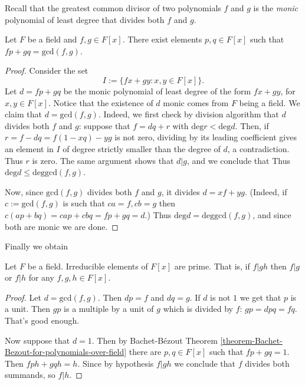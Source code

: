 Recall that the greatest common divisor of two polynomials $f$ and $g$ 
is the {\it monic}
polynomial of least degree that divides both $f$ and $g$.

\begin{theorem}
\label{theorem-Bachet-Bezout-for-polynomials-over-field}
\begin{reference}
\cite[Theorem 1.53]{MMST}
\end{reference}
Let $F$ be a field and $f,g\in F[x]$. 
There exist elements  $p,q \in F[x]$ such that $fp+gq=\text{gcd}(f,g)$.
\end{theorem}

\begin{proof}
Consider the set
$$
I:=\{fx+gy:x,y \in F[x]\}.
$$
Let $d=fp+gq$ be the monic polynomial of least degree 
of the form $fx+gy$, for $x,y \in F[x]$.
Notice that the existence of $d$ monic comes from $F$ being a field.
We claim that $d=\text{gcd}(f,g)$. 
Indeed, we first check by division algorithm
that $d$ divides both $f$ and $g$: 
suppose that $f=dq+r$ with $\text{deg}r<\text{deg}d$. 
Then, if $r=f-dq=f(1-xq)-yg$ is not zero, 
dividing by its leading coefficient gives an element in $I$ 
of degree strictly smaller than the degree of $d$, a contradiction.
Thus $r$ is zero. The same argument shows that $d|g$, and we conclude that
Thus $\text{deg}d \leq \text{deg}\text{gcd}(f,g)$. 

Now, since
$\text{gcd}(f,g)$ divides both $f$ and $g$, it divides $d=xf+yg$. (Indeed, if
$c:=\text{gcd}(f,g)$ is such that $ca=f,cb=g$ then $c(ap+bq)=cap+cbq=fp+gq=d$.) 
Thus $\text{deg}d=\text{deg}\text{gcd}(f,g)$, and since both are monic we are
done.
\end{proof}

Finally we obtain

\begin{lemma}
\label{lemma-irreducible-is-prime-in-F[x]}
Let $F$ be a field. Irreducible elements of $F[x]$ are prime. That is, if $f|gh$
then $f|g$ or $f|h$ for any $f,g,h \in F[x]$.
\end{lemma}

\begin{proof}
Let $d=\text{gcd}(f,g)$. Then $dp=f$ and $dq=g$. If $d$ is not $1$ 
we get that $p$ is a unit. Then $gp$ is a multiple by a unit of $g$ which is
divided by $f$: $gp=dpq=fq$. That's good enough.

Now suppose that $d=1$. Then by Bachet-Bézout Theorem
\ref{theorem-Bachet-Bezout-for-polynomials-over-field} 
there are $p,q \in F[x]$ such that $fp+gq=1$. Then $fph+gqh=h$. Since by
hypothesis $f|gh$ we conclude that $f$ divides both summands, so $f|h$.
\end{proof}

